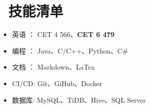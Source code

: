 \documentclass{resume}
\begin{document}
\section{\faCogs\ 技能清单}
\begin{itemize}[parsep=0.5ex]
  \item 英语 ：		   CET 4 566、\textbf{CET 6 479}
  \item 编程 ：		   Java、C/C++、Python、C\#
  \item 文档 ：		   Markdown、LaTex
  \item CI/CD:		  Git、GiHub、Docker
  \item 数据库:		   MySQL、TiDB、Hive、SQL Server
  
\end{itemize}



%
%
\end{document}
